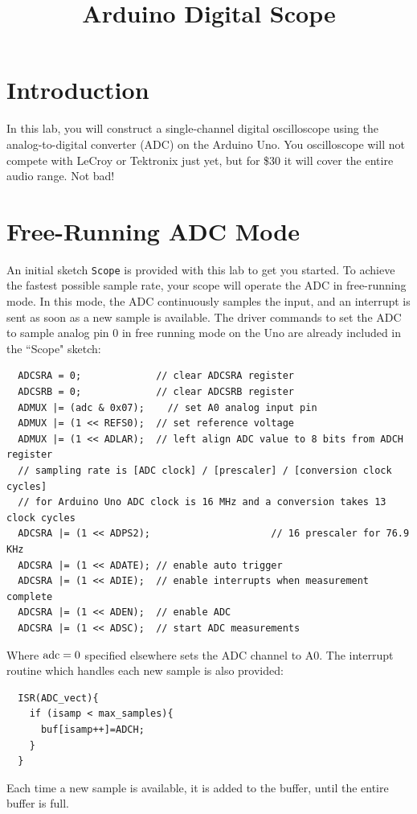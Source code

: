\documentclass[12pt]{article}
\begin{document}
\title{Arduino Digital Scope} 

\maketitle

\section{Introduction}

In this lab, you will construct a single-channel digital oscilloscope using the analog-to-digital converter (ADC) on the Arduino Uno.  You oscilloscope will not compete with LeCroy or Tektronix just yet, but for \$30 it will cover the entire audio range.  Not bad!

\section{Free-Running ADC Mode}

An initial sketch {\tt Scope} is provided with this lab to get you started.  To achieve the fastest possible sample rate, your scope will operate the ADC in free-running mode.  In this mode, the ADC continuously samples the input, and an interrupt is sent as soon as a new sample is available.  The driver commands to set the ADC to sample analog pin 0 in free running mode on the Uno are already included in the ``Scope" sketch:
 \begin{verbatim}
  ADCSRA = 0;             // clear ADCSRA register
  ADCSRB = 0;             // clear ADCSRB register
  ADMUX |= (adc & 0x07);    // set A0 analog input pin
  ADMUX |= (1 << REFS0);  // set reference voltage
  ADMUX |= (1 << ADLAR);  // left align ADC value to 8 bits from ADCH register
  // sampling rate is [ADC clock] / [prescaler] / [conversion clock cycles]
  // for Arduino Uno ADC clock is 16 MHz and a conversion takes 13 clock cycles
  ADCSRA |= (1 << ADPS2);                     // 16 prescaler for 76.9 KHz
  ADCSRA |= (1 << ADATE); // enable auto trigger
  ADCSRA |= (1 << ADIE);  // enable interrupts when measurement complete
  ADCSRA |= (1 << ADEN);  // enable ADC
  ADCSRA |= (1 << ADSC);  // start ADC measurements
\end{verbatim}
Where $\rm adc=0$ specified elsewhere sets the ADC channel to A0.  The interrupt routine which handles each new sample is also provided:
\begin{verbatim}
  ISR(ADC_vect){
    if (isamp < max_samples){
      buf[isamp++]=ADCH;
    }
  }    
\end{verbatim}
Each time a new sample is available, it is added to the buffer, until the entire buffer is full. 
\end{document}
